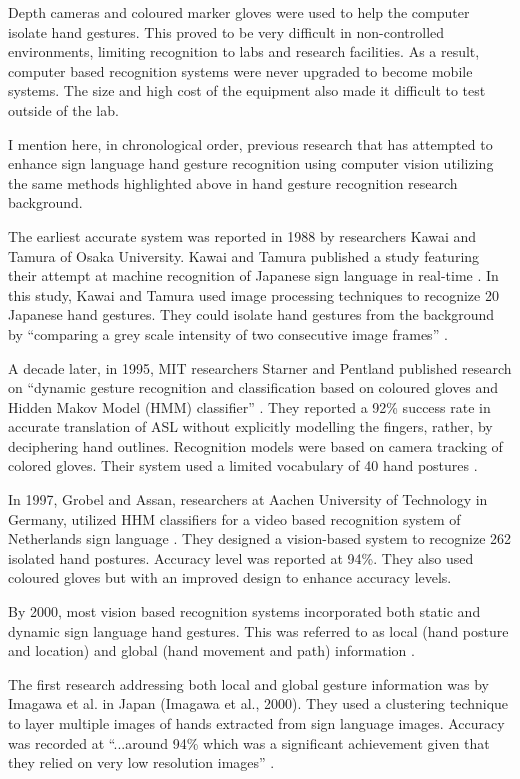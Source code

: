 Depth cameras and coloured marker gloves were used to help the computer isolate hand gestures. This proved to be very difficult in non-controlled environments, limiting recognition to labs and research facilities. As a result, computer based recognition systems were never upgraded to become mobile systems. The size and high cost of the equipment also made it difficult to test outside of the lab.  

I mention here, in chronological order, previous research that has attempted to enhance sign language hand gesture recognition using computer vision utilizing the same methods highlighted above in hand gesture recognition research background.

The earliest accurate system was reported in 1988 by researchers Kawai and Tamura of Osaka University. Kawai and Tamura published a study featuring their attempt at machine recognition of Japanese sign language in real-time \parencite{Tamura1988}. In this study, Kawai and Tamura used image processing techniques to recognize 20 Japanese hand gestures. They could isolate hand gestures from the background by ``comparing a grey scale intensity of two consecutive image frames'' \parencite{Tamura1988}.

A decade later, in 1995, MIT researchers Starner and Pentland published research on ``dynamic gesture recognition and classification based on coloured gloves and Hidden Makov Model (HMM) classifier'' \parencite{Starner1995b}. They reported a 92\% success rate in accurate translation of ASL without explicitly modelling the fingers, rather, by deciphering hand outlines. Recognition models were based on camera tracking of colored gloves. Their system used a limited vocabulary of 40 hand postures \parencite{Starner1995b}. 

In 1997, Grobel and Assan, researchers at Aachen University of Technology in Germany, utilized HHM classifiers for a video based recognition system of Netherlands sign language \parencite{Grobel1997}. They designed a vision-based system to recognize 262 isolated hand postures. Accuracy level was reported at 94\%. They also used coloured gloves but with an improved design to enhance accuracy levels. 

By 2000, most vision based recognition systems incorporated both static and dynamic sign language hand gestures. This was referred to as local (hand posture and location) and global (hand movement and path) information \parencite{Imagawa2000}.

The first research addressing both local and global gesture information was by Imagawa et al. in Japan (Imagawa et al., 2000). They used a clustering technique to layer multiple images of hands extracted from sign language images. Accuracy was recorded at ``...around 94\% which was a significant achievement given that they relied on very low resolution images'' \parencite{Premaratne2010}.

